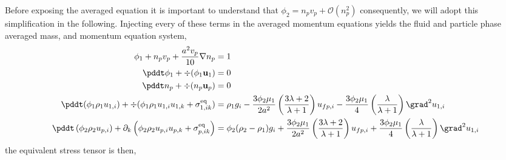 Before exposing the averaged equation it is important to understand that $\phi_2 = n_p v_p + \mathcal{O}(n_p^2)$ consequently, we will adopt this simplification in the following. 
Injecting every of these terms in the averaged momentum equations yields the fluid and particle phase averaged mass, and momentum equation system, 
\begin{align*}
    \phi_1
    + n_pv_p + \frac{a^2 v_p}{10}\nabla n_p
    &= 1
    \\
    \pddt \phi_1
    + \div (
        \phi_1\textbf{u}_1
    )
    &= 
    0\\
    \pddt n_p
    + \div (
        n_p\textbf{u}_p
    )
    &= 
    0\\
    \pddt (\phi_1 \rho_1u_{1,i})  
    + \div (
        \phi_1 \rho_1u_{1,i}u_{1,k}
        + {\sigma}_{1,ik}^\text{eq}
    )
    &=  \rho_1 g_i 
    -  \frac{3\phi_2\mu_1}{2 a^2} 
    \left(\frac{3\lambda+2}{\lambda+1}\right) u_{f p,i} 
    - \frac{3\phi_2\mu_1}{4} \left(\frac{\lambda}{\lambda+1}\right)\grad^2u_{1,i}\\
    \pddt \left(\phi_2\rho_2 {u}_{p,i}\right)
    + \partial_{k} \left(\phi_2\rho_2 {u}_{p,i} {u}_{p,k} 
    + {\sigma}_{p,ik}^\text{eq}
    \right)
    &= 
    \phi_2(\rho_2 -\rho_1)g_i 
    + \frac{3\phi_2\mu_1}{2 a^2} 
    \left(\frac{3\lambda+2}{\lambda+1}\right) u_{f p,i} 
    + \frac{3\phi_2\mu_1}{4} \left(\frac{\lambda}{\lambda+1}\right)\grad^2u_{1,i}
\end{align*}
the equivalent stress tensor is then, 
